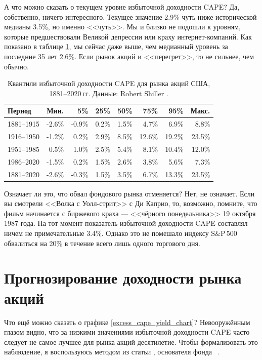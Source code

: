 А что можно сказать о текущем уровне избыточной доходности CAPE? Да, 
собственно, ничего интересного. Текущее значение 2.9\% чуть ниже исторической 
медианы 3.5\%, но именно <<чуть>>. Мы и близко не подошли к уровням, которые 
предшествовали Великой депрессии или краху интернет-компаний. Как показано в 
таблице \ref{cape_excess_yield_quantiles_table}, мы сейчас даже выше, чем 
медианный уровень за последние 35 лет 2.6\%. Если рынок акций и 
<<перегрет>>, то не сильнее, чем обычно.

\begin{table}[h!]
\centering
\begin{tabular}{l|r|r|r|r|r|r|r}
Период     & Мин.   & 5\%    & 25\%  & 50\%  & 75\%   & 95\%   & Макс. \\ \hline
1881--1915 & -2.6\% & -0.9\% & 0.2\% & 1.5\% &  4.7\% &  6.9\% &  8.8\% \\
1916--1950 & -1.2\% &  0.2\% & 2.9\% & 8.5\% & 12.6\% & 19.2\% & 23.5\% \\
1951--1985 &  0.5\% &  1.0\% & 2.5\% & 5.4\% &  8.1\% & 10.4\% & 12.0\% \\
1986--2020 & -1.5\% &  0.2\% & 1.5\% & 2.6\% &  3.8\% &  5.6\% &  7.3\% \\ \hline
1881--2020 & -2.6\% & -0.3\% & 1.5\% & 3.5\% &  6.7\% & 13.3\% & 23.5\%
\end{tabular}
\caption{Квантили избыточной доходности CAPE для рынка акций США, 1881--2020\,гг. Данные: Robert Shiller \cite{shillerOnline}.}
\label{cape_excess_yield_quantiles_table}
\end{table}

Означает ли это, что обвал фондового рынка отменяется? Нет, не означает. Если 
вы смотрели <<Волка с Уолл-стрит>> с Ди Каприо, то, возможно, помните, что 
фильм начинается с биржевого краха --- <<чёрного понедельника>> 19 октября 
1987 года. На тот момент показатель избыточной доходности CAPE составлял ничем 
не примечательные 3.4\%. Однако это не помешало индексу S\&P\,500 обвалиться 
на 20\% в течение всего лишь одного торгового дня. 


\section*{Прогнозирование доходности рынка акций}

Что ещё можно сказать о графике \ref{excess_cape_yield_chart}? Невооружённым 
глазом видно, что за низкими значениями избыточной доходности CAPE часто 
следует не самое лучшее для рынка акций десятилетие. Чтобы формализовать это 
наблюдение, я воспользуюсь методом из статьи , основателя фонда \ \cite{asness2012old}.

